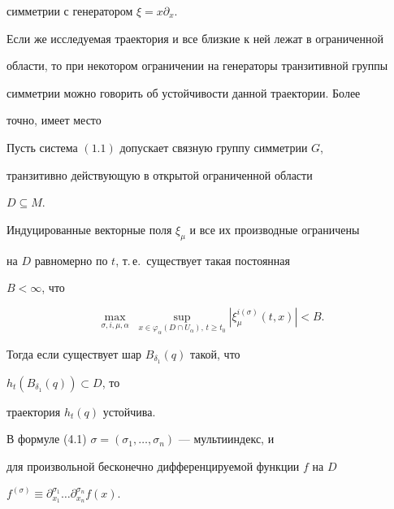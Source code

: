 симметрии с генератором $\xi=x\partial_x$. 


 


Если же исследуемая траектория и все близкие к ней лежат в ограниченной 


области, то при некотором ограничении на генераторы транзитивной группы 


симметрии можно говорить об устойчивости данной траектории. Более 


точно, имеет место 


 


\begin{thm} 


Пусть система $(1.1)$ допускает связную группу симметрии $G$, 


транзитивно действующую в открытой ограниченной области 


$D\subseteq M$. 


Индуцированные векторные поля $\xi_\mu$ и все их производные ограничены 


на $D$ равномерно по $t$, т.\,е.~существует такая постоянная 


$B<\infty$, что 


\begin{equation} 


\max_{\sigma,i,\mu,\alpha}\; 


\sup_{x\in\varphi_\alpha(D\cap U_\alpha),\,t\ge t_0} 


|\xi^{i(\sigma)}_\mu(t,x)|<B. 


\end{equation} 


Тогда если существует шар $B_{\delta_1}(q)$ такой, что 


$h_t(B_{\delta_1}(q))\subset D$, то 


траектория $h_t(q)$ устойчива. 


\end{thm} 


 


В формуле (4.1) $\sigma=(\sigma_1,\dotsc,\sigma_n)$ --- мультииндекс, и 


для произвольной бесконечно дифференцируемой функции $f$ на $D$\; 


$f^{(\sigma)}\equiv\partial^{\sigma_1}_{x_1}\dotsc 


\partial^{\sigma_n}_{x_n}f(x)$. 


 


